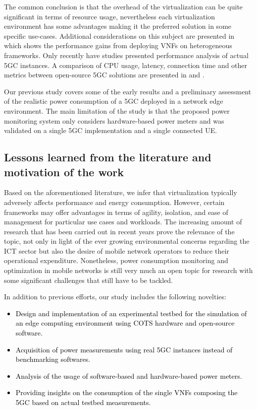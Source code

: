 The common conclusion is that the overhead of the virtualization can be quite significant in terms of resource usage, nevertheless each virtualization environment has some advantages making it the preferred solution in some specific use-cases.
Additional considerations on this subject are presented in \cite{Adoga2022} which shows the performance gains from deploying VNFs on heterogeneous frameworks.
Only recently have studies presented performance analysis of actual 5GC instances. A comparison of CPU usage, latency, connection time and other metrics between open-source 5GC solutions are presented in \cite{Reddy2023} and \cite{Lando2023}.

Our previous study \cite{Bellin2023} covers some of the early results and a preliminary assessment of the realistic power consumption of a 5GC deployed in a network edge environment. The main limitation of the study is that the proposed power monitoring system only considers hardware-based power meters and was validated on a single 5GC implementation and a single connected UE.

\subsection{Lessons learned from the literature and motivation of the work}
\label{subsec:Motivation}

Based on the aforementioned literature, we infer that virtualization typically adversely affects performance and energy consumption. However, certain frameworks may offer advantages in terms of agility, isolation, and ease of management for particular use cases and workloads.
The increasing amount of research that has been carried out in recent years prove the relevance of the topic, not only in light of the ever growing environmental concerns regarding the ICT sector but also the desire of mobile network operators to reduce their operational expenditure.
Nonetheless, power consumption monitoring and optimization in mobile networks is still very much an open topic for research with some significant challenges that still have to be tackled.

In addition to previous efforts, our study includes the following novelties:
\textcolor{black}{
\begin{itemize}
    \item Design and implementation of an experimental testbed for the simulation of an edge computing environment using COTS hardware and open-source software.
    \item Acquisition of power measurements using real 5GC instances instead of benchmarking softwares.
    \item Analysis of the usage of software-based and hardware-based power meters.
    \item Providing insights on the consumption of the single VNFs composing the 5GC based on actual testbed measurements.
\end{itemize}
}